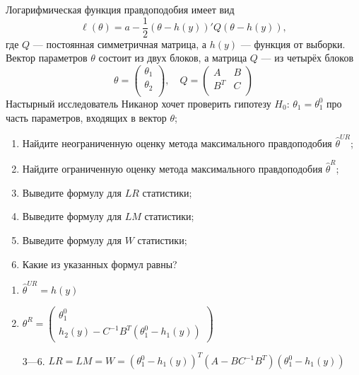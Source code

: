 \begin{problem}
  Логарифмическая функция правдоподобия имеет вид
  \[
     \ell(\theta) = a - \frac{1}{2}(\theta - h(y))' Q (\theta - h(y)),
  \]
  где $Q$ — постоянная симметричная матрица, а $h(y)$ — функция от выборки.
  Вектор параметров $\theta$ состоит из двух блоков, а матрица $Q$ — из четырёх блоков
  \[
    \theta = \begin{pmatrix}
      \theta_1 \\
      \theta_2 \\
    \end{pmatrix}, \quad
    Q = \begin{pmatrix}
      A & B \\
      B^T & C \\
    \end{pmatrix}
  \]
Настырный исследователь Никанор хочет проверить гипотезу $H_0$: $\theta_1 = \theta_1^0$ про часть параметров, входящих в вектор $\theta$;


  \begin{enumerate}
    \item Найдите неограниченную оценку метода максимального правдоподобия $\hat \theta^{UR}$;
    \item Найдите ограниченную оценку метода максимального правдоподобия $\hat \theta^{R}$;
    \item Выведите формулу для $LR$ статистики;
    \item Выведите формулу для $LM$ статистики;
    \item Выведите формулу для $W$ статистики;
    \item Какие из указанных формул равны?
  \end{enumerate}


\begin{sol}
\begin{enumerate}
\item $\hat \theta^{UR} = h(y)$
\item $\theta^{R} = \begin{pmatrix}
\theta_1^0 \\
h_2(y) - C^{-1}B^T(\theta_1^0 - h_1(y))
\end{pmatrix}$
\item[3—6.] $LR=LM=W= (\theta_1^0 - h_1(y))^T(A-BC^{-1}B^T)(\theta_1^0 - h_1(y))$
\end{enumerate}
\end{sol}
\end{problem}


